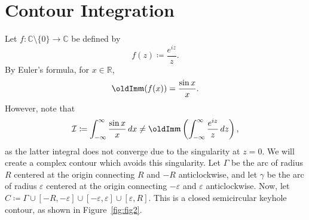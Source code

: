 \documentclass[a4paper]{article}
\newcommand*\diff{\mathop{}\!d} %
\renewcommand{\Im}{\mathop{\oldIm\mathfrak{m}}}
\theoremstyle{definition}
\begin{document}
\section{Contour Integration}

Let $f: \mathbb{C} \setminus \{0\} \to \mathbb{C}$ be defined by
\begin{equation*}
    f(z) \coloneq \frac{e^{iz}}{z}.
\end{equation*}
By Euler's formula, for $x \in \mathbb{R}$,
\begin{equation*}
    \Im (f(x)) = \frac{\sin x}{x}.
\end{equation*}
However, note that
\begin{equation*}
    \mathcal{I} \coloneq \int_{-\infty}^{\infty} \frac{\sin x}{x} \diff x \neq \Im \left( \int_{-\infty}^{\infty} \frac{e^{iz}}{z} \diff z \right),
\end{equation*}
as the latter integral does not converge due to the singularity at $z=0$.
We will create a complex contour which avoids this singularity.
Let $\Gamma$ be the arc of radius $R$ centered at the origin connecting $R$ and $-R$ anticlockwise, and let $\gamma$ be the arc of radius $\varepsilon$ centered at the origin connecting $-\varepsilon$ and $\varepsilon$ anticlockwise.
Now, let $C \coloneq \Gamma \cup [-R, -\varepsilon] \cup [-\varepsilon, \varepsilon] \cup [\varepsilon, R]$.
This is a closed semicircular keyhole contour, as shown in Figure~\ref{fig:fig2}.
\end{document}
